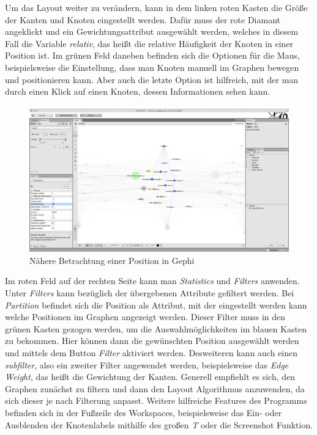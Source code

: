 Um das Layout weiter zu verändern, kann in dem linken roten Kasten die Größe der Kanten und Knoten eingestellt werden. Dafür muss der rote Diamant angeklickt und ein Gewichtungsattribut ausgewählt werden, welches in diesem Fall die Variable \textit{relativ}, das heißt die relative Häufigkeit der Knoten in einer Position ist. Im grünen Feld daneben befinden sich die Optionen für die Maus, beispielsweise die Einstellung, dass man Knoten manuell im Graphen bewegen und positionieren kann. Aber auch die letzte Option ist hilfreich, mit der man durch einen Klick auf einen Knoten, dessen Informationen sehen kann.
\begin{figure}[H]
    \centering\includegraphics[scale=0.23]{ergebnis_gephi.png}\caption{Nähere Betrachtung einer Position in Gephi}\label{ergebnis}
\end{figure}
\noindent Im roten Feld auf der rechten Seite kann man \textit{Statistics} und \textit{Filters} anwenden. Unter \textit{Filters} kann bezüglich der übergebenen Attribute gefiltert werden. Bei \textit{Partition} befindet sich die Position als Attribut, mit der eingestellt werden kann welche Positionen im Graphen angezeigt werden. Dieser Filter muss in den grünen Kasten gezogen werden, um die Auswahlmöglichkeiten im blauen Kasten zu bekommen. Hier können dann die gewünschten Position ausgewählt werden und mittels dem Button \textit{Filter} aktiviert werden. Desweiteren kann auch einen \textit{subfilter}, also ein zweiter Filter angewendet werden, beispielsweise das \textit{Edge Weight}, das heißt die Gewichtung der Kanten. Generell empfiehlt es sich, den Graphen zunächst zu filtern und dann den Layout Algorithmus anzuwenden, da sich dieser je nach Filterung anpasst. Weitere hilfreiche Features des Programms befinden sich in der Fußzeile des Workspaces, beispielsweise das Ein- oder Ausblenden der Knotenlabels mithilfe des großen \textit{T} oder die Screenshot Funktion.\\
